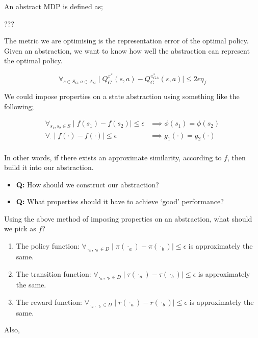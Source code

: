 An abstract MDP is defined as;

???

The metric we are optimising is the representation error of the optimal
policy. Given an abstraction, we want to know how well the abstraction
can represent the optimal policy.

\[
\forall_{s\in S_G, a\in A_G} \mid Q_G^{\pi^* }(s, a) - Q_G^{\pi_{GA}^* }(s, a) \mid \le 2 \epsilon \eta_f
\]

We could impose properties on a state abstraction using something like
the following;


\begin{align}
\forall_{s_1, s_2 \in S} \mid f(s_1) - f(s_2)\mid \le \epsilon &\implies \phi (s_1) = \phi(s_2)\\
\forall_{\cdot} \mid f(\cdot) - f(\cdot)\mid \le \epsilon &\implies g_1(\cdot) = g_2(\cdot)\\
\end{align}


In other words, if there exists an approximate similarity, according to
\(f\), then build it into our abstraction.

\begin{itemize}
\tightlist
\item
  \textbf{Q:} How should we construct our abstraction?
\item
  \textbf{Q:} What properties should it have to achieve `good'
  performance?
\end{itemize}

Using the above method of imposing properties on an abstraction, what
should we pick as \(f\)?

\begin{enumerate}
\def\labelenumi{\arabic{enumi}.}
\tightlist
\item
  The policy function:
  \(\forall_{\cdot_a, \cdot_b \in D} \mid \pi(\cdot_a) - \pi(\cdot_b) \mid \le \epsilon\)
  is approximately the same.
\item
  The transition function:
  \(\forall_{\cdot_a, \cdot_b \in D} \mid \tau(\cdot_a) - \tau(\cdot_b)\mid \le \epsilon\)
  is approximately the same.
\item
  The reward function:
  \(\forall_{\cdot_a, \cdot_b \in D} \mid r(\cdot_a) - r(\cdot_b) \mid \le \epsilon\)
  is approximately the same.
\end{enumerate}

Also,

